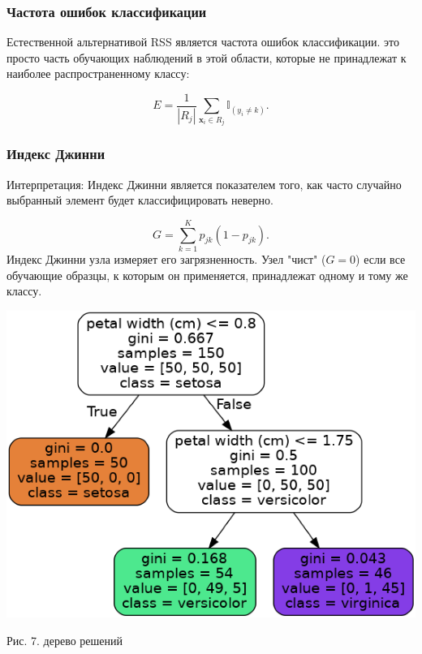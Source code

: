 \documentclass{article}
\begin{document}
\subsubsection{Частота ошибок классификации}

Естественной альтернативой RSS является частота ошибок классификации. это просто часть обучающих наблюдений в этой области, которые не принадлежат к наиболее распространенному классу:

\begin{equation}
	E = \dfrac{1}{|R_j|} \sum\limits_{\textbf{x}_i \in R_j}^{} \mathbb{I}_{(y_i \neq k)}.
\end{equation}

\subsubsection{Индекс Джинни}

Интерпретация: Индекс Джинни является показателем того, как часто случайно выбранный элемент будет классифицировать неверно.

\begin{equation}
	G = \sum\limits_{k=1}^{K} {p}_{jk}(1-{p}_{jk}).
\end{equation}
Индекс Джинни узла измеряет его загрязненность. Узел "чист" ($G = 0$) если все обучающие образцы, к которым он применяется, принадлежат одному и тому же классу.

\begin{center}
	\includegraphics[scale=0.5]{piciris}
\end{center}
\begin{center}
	Рис. 7. дерево решений
\end{center}
\end{document}
